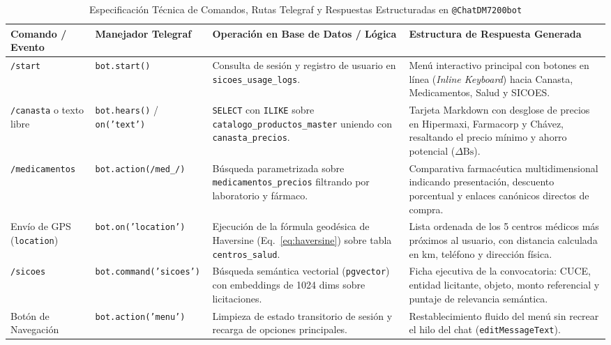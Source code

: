 \begin{table}[htbp]
    \centering
    \footnotesize
    \renewcommand{\arraystretch}{0.95}
    \setlength{\tabcolsep}{5pt}
    \caption{Especificación Técnica de Comandos, Rutas Telegraf y Respuestas Estructuradas en \texttt{@ChatDM7200bot}}
    \label{tab:telegram_comandos}
    \begin{tabularx}{\linewidth}{>{\raggedright\arraybackslash}p{2.5cm} >{\raggedright\arraybackslash}p{3.9cm} >{\raggedright\arraybackslash}p{4.7cm} L}
        \toprule
        \textbf{Comando / Evento} & \textbf{Manejador Telegraf} & \textbf{Operación en Base de Datos / Lógica} & \textbf{Estructura de Respuesta Generada} \\
        \midrule
        \texttt{/start} & \texttt{bot.start()} & Consulta de sesión y registro de usuario en \nolinkurl{sicoes_usage_logs}. & Menú interactivo principal con botones en línea (\textit{Inline Keyboard}) hacia Canasta, Medicamentos, Salud y SICOES. \\
        \addlinespace[3pt]
        \texttt{/canasta} \newline o texto libre & \texttt{bot.hears()} / \newline \texttt{on('text')} & \texttt{SELECT} con \texttt{ILIKE} sobre \nolinkurl{catalogo_productos_master} uniendo con \nolinkurl{canasta_precios}. & Tarjeta Markdown con desglose de precios en Hipermaxi, Farmacorp y Chávez, resaltando el precio mínimo y ahorro potencial ($\Delta\text{Bs}$). \\
        \addlinespace[3pt]
        \texttt{/medicamentos} & \texttt{bot.action(/med\_/)} & Búsqueda parametrizada sobre \nolinkurl{medicamentos_precios} filtrando por laboratorio y fármaco. & Comparativa farmacéutica multidimensional indicando presentación, descuento porcentual y enlaces canónicos directos de compra. \\
        \addlinespace[3pt]
        Envío de GPS \newline (\texttt{location}) & \texttt{bot.on('location')} & Ejecución de la fórmula geodésica de Haversine (Eq.~\ref{eq:haversine}) sobre tabla \nolinkurl{centros_salud}. & Lista ordenada de los 5 centros médicos más próximos al usuario, con distancia calculada en km, teléfono y dirección física. \\
        \addlinespace[3pt]
        \texttt{/sicoes} & \texttt{bot.command('sicoes')} & Búsqueda semántica vectorial (\texttt{pgvector}) con embeddings de 1024 dims sobre licitaciones. & Ficha ejecutiva de la convocatoria: CUCE, entidad licitante, objeto, monto referencial y puntaje de relevancia semántica. \\
        \addlinespace[3pt]
        Botón de Navegación & \texttt{bot.action('menu')} & Limpieza de estado transitorio de sesión y recarga de opciones principales. & Restablecimiento fluido del menú sin recrear el hilo del chat (\texttt{editMessageText}). \\
        \bottomrule
    \end{tabularx}
\end{table}


